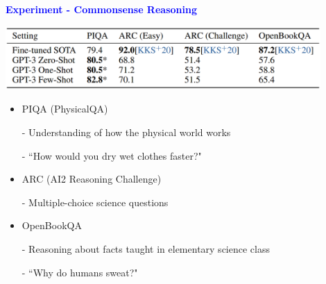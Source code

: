 \documentclass[professionalfont]{beamer}
\begin{document}
\begin{frame}

\begin{center}
    { \textbf{\textcolor{blue}{ {\fontsize{12}{14}\selectfont Experiment - Commonsense Reasoning} }} }
\end{center}

\begin{center}
    \includegraphics[width=0.9\textwidth]{table/3-6.png}
\end{center}

{\fontsize{10}{14}\selectfont 
\begin{itemize}
    \item PIQA (PhysicalQA)

    - Understanding of how the physical world works

    - ``How would you dry wet clothes faster?"

    \item ARC (AI2 Reasoning Challenge)

    - Multiple-choice science questions

    \item OpenBookQA

    - Reasoning about facts taught in elementary science class

    - ``Why do humans sweat?"

\end{itemize}
}

\end{frame}
\end{document}
